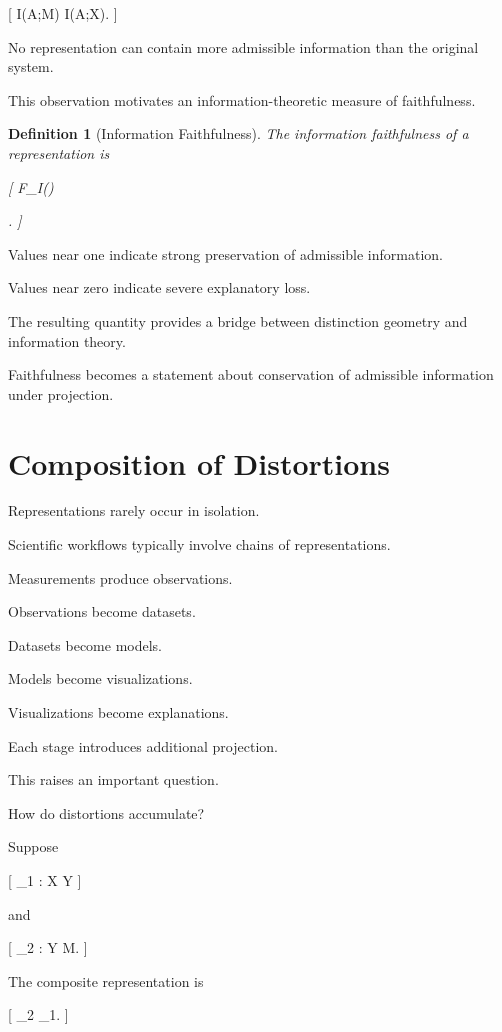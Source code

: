 \documentclass[11pt,oneside,openany]{book}
\newtheorem{definition}{Definition}[chapter] \newtheorem{theorem}{Theorem}[chapter] \newtheorem{proposition}{Proposition}[chapter] \newtheorem{lemma}{Lemma}[chapter] \newtheorem{corollary}{Corollary}[chapter] \newtheorem{remark}{Remark}[chapter]
\begin{document}
[
I(A;M)
\leq
I(A;X).
]

No representation can contain more admissible information than the original system.

This observation motivates an information-theoretic measure of faithfulness.

\begin{definition}[Information Faithfulness]

The information faithfulness of a representation is

[
F_I(\pi)

.
]

\end{definition}

Values near one indicate strong preservation of admissible information.

Values near zero indicate severe explanatory loss.

The resulting quantity provides a bridge between distinction geometry and information theory.

Faithfulness becomes a statement about conservation of admissible information under projection.

\section{Composition of Distortions}

Representations rarely occur in isolation.

Scientific workflows typically involve chains of representations.

Measurements produce observations.

Observations become datasets.

Datasets become models.

Models become visualizations.

Visualizations become explanations.

Each stage introduces additional projection.

This raises an important question.

How do distortions accumulate?

Suppose

[
\pi_1
:
\mathcal X
\rightarrow
\mathcal Y
]

and

[
\pi_2
:
\mathcal Y
\rightarrow
\mathcal M.
]

The composite representation is

[
\pi_2
\circ
\pi_1.
]
\end{document}

